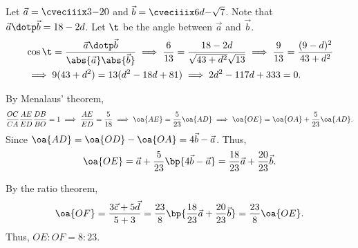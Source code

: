 \begin{solution}
    \begin{ppart}
        Let $\vec a = \cveciiix3{-2}0$ and $\vec b = \cveciiix6d{-\sqrt7}$. Note that $\vec a \dotp \vec b = 18 - 2d$. Let $\t$ be the angle between $\vec a$ and $\vec b$.
        \begin{align*}
            &\cos \t = \frac{\vec a \dotp \vec b}{\abs{\vec a}\abs{\vec b}} \implies \frac6{13} = \frac{18-2d}{\sqrt{43 + d^2}\sqrt{13}} \implies \frac{9}{13} = \frac{(9-d)^2}{43 + d^2}\\
            &\implies 9(43 + d^2) = 13(d^2 - 18d + 81) \implies 2d^2 - 117d + 333 = 0.
        \end{align*}
    \end{ppart}
    \begin{ppart}
        \begin{psubpart}
            By Menalaus' theorem, \[\frac{OC}{CA} \frac{AE}{ED} \frac{DB}{BO} = 1 \implies \frac{AE}{ED} = \frac{5}{18} \implies \oa{AE} = \frac5{23} \oa{AD} \implies \oa{OE} = \oa{OA} + \frac5{23} \oa{AD}.\] Since $\oa{AD} = \oa{OD} - \oa{OA} = 4\vec b - \vec a$. Thus, \[\oa{OE} = \vec a + \frac5{23} \bp{4\vec b - \vec a} = \frac{18}{23} \vec a + \frac{20}{23} \vec b.\]
        \end{psubpart}
        \begin{psubpart}
            By the ratio theorem, \[\oa{OF} = \frac{3\vec c + 5\vec d}{5 + 3} = \frac{23}8 \bp{\frac{18}{23} \vec a + \frac{20}{23} \vec b} = \frac{23}8 \oa{OE}.\] Thus, $OE : OF = 8 : 23$.
        \end{psubpart}
    \end{ppart}
\end{solution}


